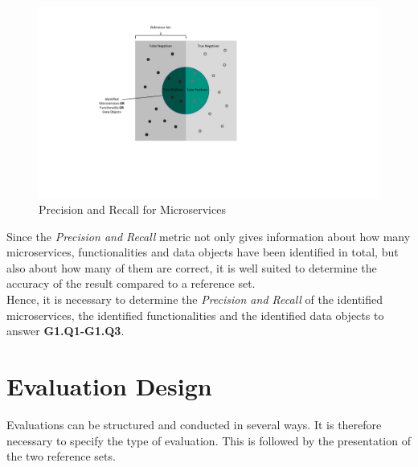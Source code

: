 \begin{figure}[!h]
	\includegraphics[width=\textwidth, trim={6cm 5.5cm 11cm 0.5cm}]{img/PrecisionRecall.pdf}
	\caption{Precision and Recall for Microservices}
	\label{fig:PrecisionRecall}
\end{figure}

\pagebreak

\noindent
Since the \textit{Precision and Recall} metric not only gives information about how many microservices, functionalities and data objects have been identified in total, but also about how many of them are correct, it is well suited to determine the accuracy of the result compared to a reference set. \\
Hence, it is necessary to determine the \textit{Precision and Recall} of the identified microservices, the identified functionalities and the identified data objects to answer \textbf{G1.Q1-G1.Q3}.

\section{Evaluation Design}
Evaluations can be structured and conducted in several ways. It is therefore necessary to specify the type of evaluation. This is followed by the presentation of the two reference sets.

